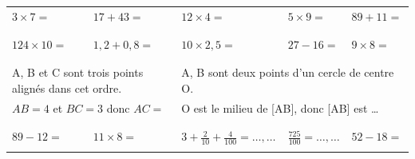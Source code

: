 \documentclass[14]{article}
\begin{document}
    \begin{tabular}{p{3cm}|p{3cm}|p{3cm}|p{3cm}|p{3cm}}
         $3\times7=$ & $17+43=$ & $12\times 4 = $ & $5\times9=$ & $89+11=$\\ 
         
         & & & &\\ \hline & & & &\\
         
         $124\times 10=$ & $1,2+0,8=$ & $10\times2,5=$ &  $27-16=$ & $9\times8=$\\
         
         & & & &\\ \hline \multicolumn{2}{c|}{} & \multicolumn{2}{c}{}\\
         
         \multicolumn{2}{l|}{A, B et C sont trois points alignés dans cet ordre.} & 
         \multicolumn{3}{l}{A, B sont deux points d'un cercle de centre O.}\\
         
         \multicolumn{2}{l|}{$AB=4$ et $BC=3$ donc $AC=$} & 
         \multicolumn{3}{l}{O est le milieu de [AB], donc [AB] est \ldots}\\

        \multicolumn{2}{c|}{} & \multicolumn{2}{c}{} \\ \hline & & & &\\

        $89-12=$ & $11\times8=$ & $3+\frac{2}{10}+\frac{4}{100}= \ldots,\ldots$ & $ \frac{725}{100}=\ldots,\ldots$ & $52-18=$ \\

        & & & &\\ 
    \end{tabular}
    
\end{document}
